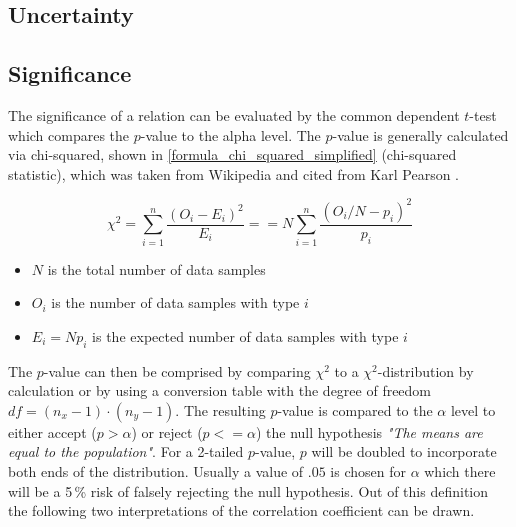 \subsection{Uncertainty}
\label{correlation_uncertainty}



\subsection{Significance}
\label{correlation_significance}
The significance of a relation can be evaluated by the common dependent $t$-test which compares the $p$-value to the alpha level. The $p$-value is generally calculated via chi-squared, shown in \autoref{formula_chi_squared_simplified} (chi-squared statistic), which was taken from Wikipedia and cited from Karl Pearson \parencite{Pearson1990}.


\begin{equation}
\label{formula_chi_squared_simplified}	
	\chi^2 = \sum_{i=1}^{n}{\frac{(O_i-E_i)^2}{E_i}} == N\sum_{i=1}^{n}{\frac{(O_i/N-p_i)^2}{p_i}}
\end{equation}

\begin{itemize}
	\setlength\itemsep{0.1em}	
	\item[] $N$ is the total number of data samples 
	\item[] $O_i$ is the number of data samples with type $i$
	\item[] $E_i = N p_i$ is the expected number of data samples with type $i$
\end{itemize}

The $p$-value can then be comprised by comparing $\chi^2$ to a $\chi^2$-distribution by calculation or by using a conversion table \parencite{Piegorsch2002} with the degree of freedom $df = (n_x - 1) \cdot (n_y - 1)$. The resulting  $p$-value is compared to the $\alpha$ level to either accept ($p > \alpha$) or reject ($p <= \alpha$) the null hypothesis \textit{"The means are equal to the population"}. For a 2-tailed $p$-value, $p$ will be doubled to incorporate both ends of the distribution. Usually a value of $.05$ is chosen for $\alpha$ which there will be a 5\,\% risk of falsely rejecting the null hypothesis. Out of this definition the following two interpretations of the correlation coefficient can be drawn. \parencite{OTSD2020}

